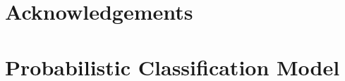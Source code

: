 \documentclass[useAMS,usenatbib,a4paper]{mn2e}
\begin{document}
\section*{Acknowledgements}
 



\appendix


\section{Probabilistic Classification Model}
\label{appendix:probmodel}




% 






\label{lastpage}
\bsp
\end{document}
